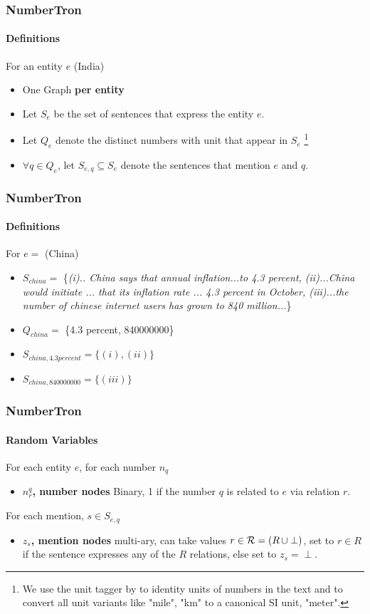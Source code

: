 \documentclass{beamer}
\begin{document}
\begin{frame}
\frametitle{NumberTron}
\framesubtitle{Definitions}
For an entity $e$ (India)
\begin{itemize}
\setlength \itemsep{1em}
 \item One Graph \textbf{per entity}
 \item Let $S_e$ be the set of sentences that express the entity $e$.
 \item Let $Q_e$ denote the distinct numbers with unit that appear in $S_e$ \footnote{We use the unit tagger by \cite{sarawagi2014} to identity units of numbers in the text and to convert all
unit variants like "mile", "km" to a canonical SI unit, "meter".}
\item $\forall q \in Q_e$, let $S_{e,q} \subseteq S_e$ denote the sentences that mention $e$ and $q$. 
\end{itemize}
\end{frame}

\begin{frame}
\frametitle{NumberTron}
\framesubtitle{Definitions}
For  $e =$ (China)
\begin{itemize}
\setlength \itemsep{1em}
 \item $S_{china} = $  
 \{\textit{\color{blue}(i).. China says that annual inflation...to 4.3 percent, (ii)...China would initiate ... that its inflation rate ... 4.3 percent in October, (iii)...the number of chinese internet users has grown to 840 million...}\}
 \item $Q_{china} = $ \{4.3 percent, 840000000\}
\item $S_{china, 4.3 percent} = \{(i), (ii)\}$ 
\item $S_{china, 840000000} = \{(iii)\}$ 
\end{itemize}
\end{frame}


\begin{frame}
\frametitle{NumberTron}
\framesubtitle{Random Variables}
For each entity $e$, for each number $n_q$
\begin{itemize}
\item \textbf{$n_r^q$, number nodes} Binary, 1 if the number $q$ is related to $e$ via relation $r$. 
\end{itemize}
\vspace{3em}
For each mention, $s \in S_{e,q}$
\begin{itemize}
\item \textbf{$z_s$, mention nodes} multi-ary, can take values $r \in {\cal R} = (R\, \cup \perp)$, set to $r \in R$ if the sentence expresses any of the $R$ relations, else set to $z_s = \perp$.
\end{itemize}
\end{frame}
\end{document}
